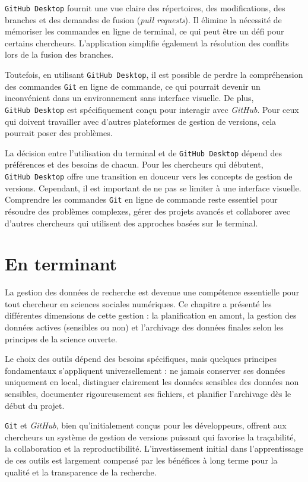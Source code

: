 \documentclass[
  letterpaper,
  DIV=11,
  numbers=noendperiod,
  oneside]{scrreprt}
\begin{document}
\texttt{GitHub\ Desktop} fournit une vue claire des répertoires, des
modifications, des branches et des demandes de fusion (\emph{pull
requests}). Il élimine la nécessité de mémoriser les commandes en ligne
de terminal, ce qui peut être un défi pour certains chercheurs.
L'application simplifie également la résolution des conflits lors de la
fusion des branches.

Toutefois, en utilisant \texttt{GitHub\ Desktop}, il est possible de
perdre la compréhension des commandes \texttt{Git} en ligne de commande,
ce qui pourrait devenir un inconvénient dans un environnement sans
interface visuelle. De plus, \texttt{GitHub\ Desktop} est spécifiquement
conçu pour interagir avec \emph{GitHub}. Pour ceux qui doivent
travailler avec d'autres plateformes de gestion de versions, cela
pourrait poser des problèmes.

La décision entre l'utilisation du terminal et de
\texttt{GitHub\ Desktop} dépend des préférences et des besoins de
chacun. Pour les chercheurs qui débutent, \texttt{GitHub\ Desktop} offre
une transition en douceur vers les concepts de gestion de versions.
Cependant, il est important de ne pas se limiter à une interface
visuelle. Comprendre les commandes \texttt{Git} en ligne de commande
reste essentiel pour résoudre des problèmes complexes, gérer des projets
avancés et collaborer avec d'autres chercheurs qui utilisent des
approches basées sur le terminal.

\hypertarget{en-terminant-3}{%
\section{En terminant}\label{en-terminant-3}}

La gestion des données de recherche est devenue une compétence
essentielle pour tout chercheur en sciences sociales numériques. Ce
chapitre a présenté les différentes dimensions de cette gestion : la
planification en amont, la gestion des données actives (sensibles ou
non) et l'archivage des données finales selon les principes de la
science ouverte.

Le choix des outils dépend des besoins spécifiques, mais quelques
principes fondamentaux s'appliquent universellement : ne jamais
conserver ses données uniquement en local, distinguer clairement les
données sensibles des données non sensibles, documenter rigoureusement
ses fichiers, et planifier l'archivage dès le début du projet.

\texttt{Git} et \emph{GitHub}, bien qu'initialement conçus pour les
développeurs, offrent aux chercheurs un système de gestion de versions
puissant qui favorise la traçabilité, la collaboration et la
reproductibilité. L'investissement initial dans l'apprentissage de ces
outils est largement compensé par les bénéfices à long terme pour la
qualité et la transparence de la recherche.
\end{document}
